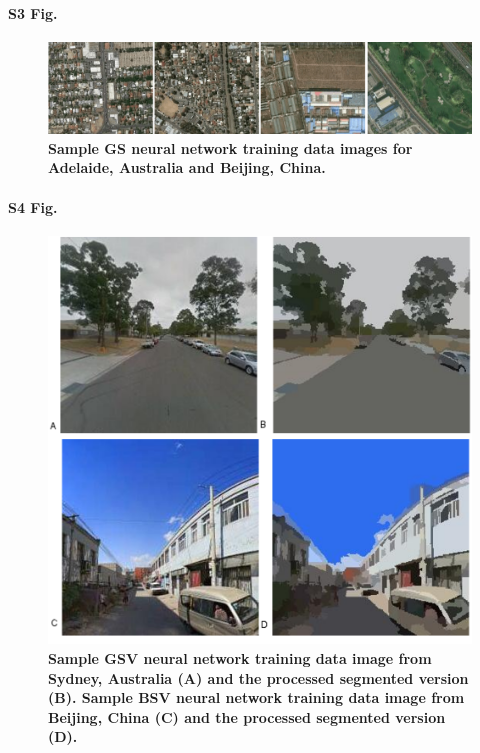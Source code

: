 \documentclass[10pt,letterpaper]{article}
\begin{document}
\paragraph*{S3 Fig.}
\begin{figure}[!htbp]
    \centering 
    \includegraphics[scale=1]{Images/PlosOne/Fig3.png}     
\caption{\bf Sample GS neural network training data images for Adelaide, Australia and Beijing, China. \cite{GoogleStatic2017}}    
 \label{fig:satbeiade}  
\end{figure} 



\paragraph*{S4 Fig.}
\begin{figure}[!htbp]
\includegraphics[scale=0.3]{Images/PlosOne/Fig4.png} 
\caption{\bf Sample GSV neural network training data image from Sydney, Australia \cite{GoogleMaps2017b} (A) and the processed segmented version (B). Sample BSV neural network training data image from Beijing, China \cite{Baidu2017} (C) and the processed segmented version (D).}    
 \label{fig:gsvbsv}  
\end{figure} 
\end{document}
